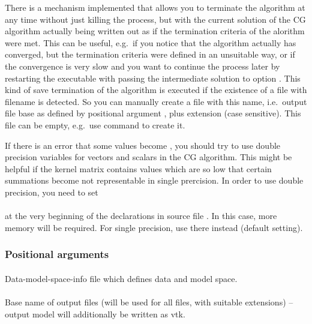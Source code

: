 There is a mechanism implemented that allows you to terminate the algorithm at any time without just killing
the process, but with the current solution of the CG algorithm actually being written out as if the termination
criteria of the alorithm were met. 
This can be useful, e.g.\ if you notice that the algorithm actually has converged, but the termination
criteria were defined in an unsuitable way, or if the convergence is very slow and you want to continue
the process later by restarting the executable with passing the intermediate solution to option . 
This kind of save termination of the algorithm is executed if the existence of a file with filename
 is detected. So you can manually create a file with this name, i.e.\ 
output file base as defined by positional argument , plus extension 
(case sensitive). This file can be empty, e.g.\ use command \lcode{touch} to create it.

If there is an error that some values become  , you should try to use double precision
variables for vectors and scalars in the CG algorithm. This might be 
helpful if the kernel matrix contains values which are so low that certain summations 
become not representable in single prercision.
In order to use double precision, you need to set\\
\\
at the very beginning of the declarations in source file  .
In this case, more memory will be required. For single precision, use \lcode{SIZE_REAL} there instead (default
setting).
\subsubsection{Positional arguments}
\paragraph{}
Data-model-space-info file which defines data and model space.
\paragraph{}
Base name of output files (will be used for all files, with suitable extensions) -- output model will additionally be written as vtk.
